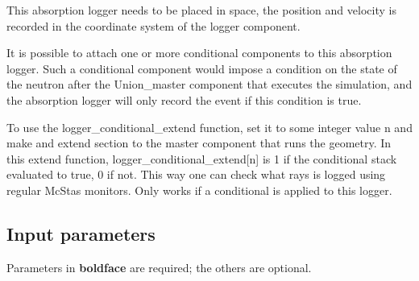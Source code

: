 This absorption logger needs to be placed in space, the position and velocity is recorded in the coordinate system of the logger component.

It is possible to attach one or more conditional components to this absorption logger. Such a conditional component would impose a condition on the state of the neutron after the Union\_master component that executes the simulation, and the absorption logger will only record the event if this condition is true.

To use the logger\_conditional\_extend function, set it to some integer value n and make and extend section to the master component that runs the geometry. In this extend function, logger\_conditional\_extend[n] is 1 if the conditional stack evaluated to true, 0 if not. This way one can check what rays is logged using regular McStas monitors. Only works if a conditional is applied to this logger.

\subsection*{Input parameters}
Parameters in \textbf{boldface} are required; the others are optional.

